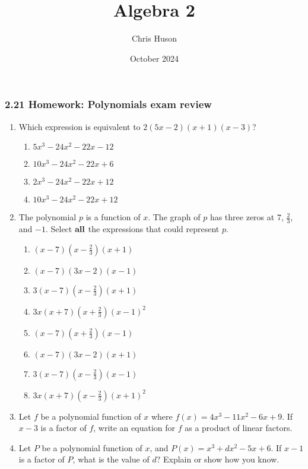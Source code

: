 \documentclass[12pt, twoside]{article}
\title{Algebra 2}
\author{Chris Huson}
\date{October 2024}
\begin{document}
\subsubsection*{2.21 Homework: Polynomials exam review}
\begin{enumerate}
\item Which expression is equivalent to $2(5x-2)(x+1)(x-3)$? \vspace{0.25cm}
    \begin{enumerate}
        \item $5x^3-24x^2-22x-12$ 
        \item $10x^3-24x^2-22x+6$ 
        \item $2x^3-24x^2-22x+12$ 
        \item $10x^3-24x^2-22x+12$ 
    \end{enumerate} \vspace{0.5cm}

\item The polynomial $p$ is a function of $x$. The graph of $p$ has three zeros at $7$, $\frac{2}{3}$, and $-1$. Select $\bf{all}$ the expressions that could represent $p$. \vspace{0.25cm}
    \begin{multicols}{2}
    \begin{enumerate}
        \item $(x-7)(x-\frac{2}{3})(x+1)$
        \item $(x-7)(3x-2)(x-1)$
        \item $3(x-7)(x-\frac{2}{3})(x+1)$
        \item $3x(x+7)(x+\frac{2}{3})(x-1)^2$
        \item $(x-7)(x+\frac{2}{3})(x-1)$
        \item $(x-7)(3x-2)(x+1)$
        \item $3(x-7)(x-\frac{2}{3})(x-1)$
        \item $3x(x+7)(x-\frac{2}{3})(x+1)^2$
    \end{enumerate}
    \end{multicols}
        \vspace{0.5cm}

\item Let $f$ be a polynomial function of $x$ where $f(x)=4x^3-11x^2-6x+9$. If $x-3$ is a factor of $f$, write an equation for $f$ as a product of linear factors.
\vspace{5cm}

\newpage
\item Let $P$ be a polynomial function of $x$, and $P(x)=x^3+dx^2-5x+6$. If $x-1$ is a factor of $P$, what is the value of $d$? Explain or show how you know.
\vspace{6cm}


\end{enumerate}
\end{document}
